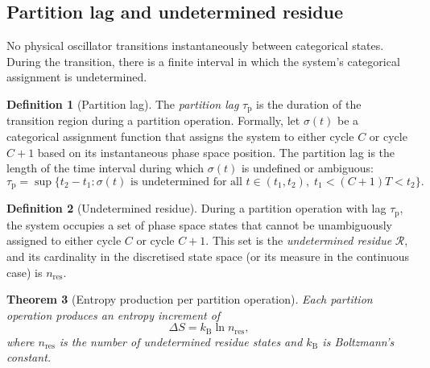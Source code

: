 \documentclass[twocolumn,10pt,a4paper]{article}
\newtheorem{theorem}{Theorem}[section]
\theoremstyle{definition}
\newtheorem{definition}[theorem]{Definition}
\theoremstyle{remark}
\newcommand{\kB}{k_{\mathrm{B}}}
\newcommand{\tauP}{\tau_{\mathrm{p}}}
\begin{document}
\subsection{Partition lag and undetermined residue}

No physical oscillator transitions instantaneously between categorical states. During the transition, there is a finite interval in which the system's categorical assignment is undetermined.

\begin{definition}[Partition lag]\label{def:partition_lag}
The \emph{partition lag} $\tauP$ is the duration of the transition region during a partition operation. Formally, let $\sigma(t)$ be a categorical assignment function that assigns the system to either cycle $C$ or cycle $C+1$ based on its instantaneous phase space position. The partition lag is the length of the time interval during which $\sigma(t)$ is undefined or ambiguous:
\begin{equation}\label{eq:partition_lag}
\tauP = \sup\{t_2 - t_1 : \sigma(t) \text{ is undetermined for all } t \in (t_1, t_2), \; t_1 < (C+1)T < t_2 \}.
\end{equation}
\end{definition}

\begin{definition}[Undetermined residue]\label{def:residue}
During a partition operation with lag $\tauP$, the system occupies a set of phase space states that cannot be unambiguously assigned to either cycle $C$ or cycle $C+1$. This set is the \emph{undetermined residue} $\mathcal{R}$, and its cardinality in the discretised state space (or its measure in the continuous case) is $n_{\mathrm{res}}$.
\end{definition}

\begin{theorem}[Entropy production per partition operation]\label{thm:partition_entropy}
Each partition operation produces an entropy increment of
\begin{equation}\label{eq:partition_entropy}
\Delta S = \kB \ln n_{\mathrm{res}},
\end{equation}
where $n_{\mathrm{res}}$ is the number of undetermined residue states and $\kB$ is Boltzmann's constant.
\end{theorem}
\end{document}
